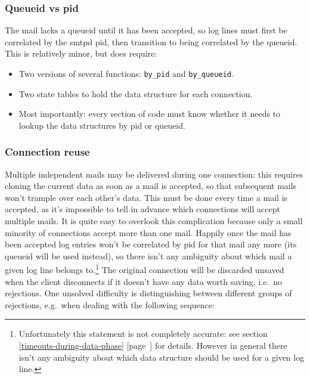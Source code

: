 \documentclass[a4paper,12pt,draft]{article}
\newcommand{\refwithpage}[1]{%
    \empty{}\ref{#1} [page~\pageref{#1}]%
}
\begin{document}
\label{complications}


\subsubsection{Queueid vs pid}

The mail lacks a queueid until it has been accepted, so log lines must
first be correlated by the smtpd pid, then transition to being correlated
by the queueid.  This is relatively minor, but does require:

\begin{itemize}

    \item Two versions of several functions: \texttt{by\_pid} and
        \texttt{by\_queueid}.

    \item Two state tables to hold the data structure for each connection.

    \item Most importantly: every section of code must know whether it
        needs to lookup the data structures by pid or queueid.

\end{itemize}

\subsubsection{Connection reuse}

Multiple independent mails may be delivered during one connection: this
requires cloning the current data as soon as a mail is accepted, so that
subsequent mails won't trample over each other's data.  This must be done
every time a mail is accepted, as it's impossible to tell in advance which
connections will accept multiple mails.  It is quite easy to overlook this
complication because only a small minority of connections accept more than
one mail. Happily once the mail has been accepted log entries won't be
correlated by pid for that mail any more (its queueid will be used
instead), so there isn't any ambiguity about which mail a given log line
belongs to.\footnote{Unfortunately this statement is not completely
accurate: see section~\refwithpage{timeouts-during-data-phase} for details.
However in general there isn't any ambiguity about which data structure
should be used for a given log line.}  The original connection will be
discarded unsaved when the client disconnects if it doesn't have any data
worth saving, i.e.\ no rejections.  One unsolved difficulty is
distinguishing between different groups of rejections, e.g.\ when dealing
with the following sequence:
\end{document}
